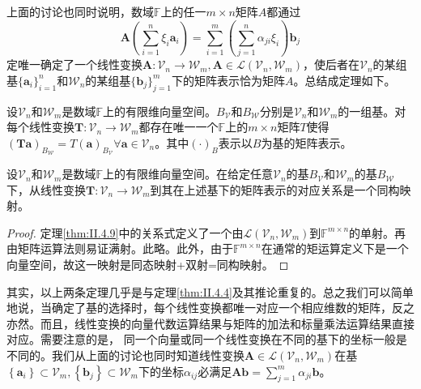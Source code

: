 \documentclass[main.tex]{subfiles}
\begin{document}
上面的讨论也同时说明，数域$\mathbb{F}$上的任一$m\times n$矩阵$A$都通过
\[
\mathbf{A}\left(\sum_{i=1}^n\xi_i\mathbf{a}_i\right)=\sum_{i=1}^m\left(\sum_{j=1}^n\alpha_{ji}\xi_i\right)\mathbf{b}_j
\]
定唯一确定了一个线性变换$\mathbf{A}:\mathcal{V}_n\rightarrow\mathcal{W}_m,\mathbf{A}\in\mathcal{L}\left(\mathcal{V}_n,\mathcal{W}_m\right)$，使后者在$\mathcal{V}_n$的某组基$\{\mathbf{a}_i\}_{i=1}^n$和$\mathcal{W}_n$的某组基$\{\mathbf{b}_j\}_{j=1}^m$下的矩阵表示恰为矩阵$A$。总结成定理如下。

\begin{theorem}\label{thm:II.4.9}
设$\mathcal{V}_n$和$\mathcal{W}_m$是数域$\mathbb{F}$上的有限维向量空间。$B_\mathcal{V}$和$B_\mathcal{W}$分别是$\mathcal{V}_n$和$\mathcal{W}_m$的一组基。对每个线性变换$\mathbf{T}:\mathcal{V}_n\rightarrow\mathcal{W}_m$都存在唯一一个$\mathbb{F}$上的$m\times n$矩阵$T$使得$\left(\mathbf{Ta}\right)_{B_\mathcal{W}}=T\left(\mathbf{a}\right)_{B_\mathcal{V}}\forall\mathbf{a}\in\mathcal{V}_n$。其中$\left(\cdot\right)_B$表示以$B$为基的矩阵表示。
\end{theorem}

\begin{theorem}\label{thm:II.4.10}
设$\mathcal{V}_n$和$\mathcal{W}_m$是数域$\mathbb{F}$上的有限维向量空间。在给定任意$\mathcal{V}_n$的基$B_\mathcal{V}$和$\mathcal{W}_m$的基$B_\mathcal{W}$下，从线性变换$\mathbf{T}:\mathcal{V}_n\rightarrow\mathcal{W}_m$到其在上述基下的矩阵表示的对应关系是一个同构映射。
\end{theorem}
\begin{proof}
定理\ref{thm:II.4.9}中的关系式定义了一个由$\mathcal{L}\left(\mathcal{V}_n,\mathcal{W}_m\right)$到$\mathbb{F}^{m\times n}$的单射。再由矩阵运算法则易证满射。此略。此外，由于$\mathbb{F}^{m\times n}$在通常的矩运算定义下是一个向量空间，故这一映射是同态映射+双射=同构映射。
\end{proof}

其实，以上两条定理几乎是与定理\ref{thm:II.4.4}及其推论重复的。总之我们可以简单地说，当确定了基的选择时，每个线性变换都唯一对应一个相应维数的矩阵，反之亦然。而且，线性变换的向量代数运算结果与矩阵的加法和标量乘法运算结果直接对应。需要注意的是， 同一个向量或同一个线性变换在不同的基下的坐标一般是不同的。我们从上面的讨论也同时知道线性变换$\mathbf{A}\in\mathcal{L}\left(\mathcal{V}_n,\mathcal{W}_m\right)$在基$\left\{\mathbf{a}_i\right\}\subset\mathcal{V}_m,\left\{\mathbf{b}_j\right\}\subset\mathcal{W}_m$下的坐标$\alpha_{ij}$必满足$\mathbf{Ab}=\sum_{j=1}^m\alpha_{ji}\mathbf{b}$。
\end{document}
